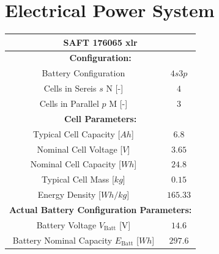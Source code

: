 \section{Electrical Power System} \label{sec:AppendixEPS}
\begin{table}[htb]
\centering
\begin{tabular}{|c|c|}
\hline
\multicolumn{2}{|c|}{\textbf{SAFT 176065 xlr} \cite{SAFTBatteries.2018}}                                                                \\ \hline
\multicolumn{2}{|c|}{\textbf{Configuration:}}                                                                 \\ \hline
Battery Configuration                                                           & $4s3p$                        \\ \hline
Cells in Sereis $s$ N [-]                                                       & $4$                           \\ \hline
Cells in Parallel $p$ M [-]                                                     & $3$                           \\ \hline
\multicolumn{2}{|c|}{\textbf{Cell Parameters:}}                                                               \\ \hline
Typical Cell Capacity   [$Ah$]                                                    & $6.8$                         \\ \hline
Nominal Cell Voltage [$V$]                                                        & $3.65$                        \\ \hline
Nominal Cell Capacity [$Wh$]                                                      & $24.8$                        \\ \hline
Typical Cell Mass [$kg$]                                                          & $0.15$                        \\ \hline
Energy Density [$Wh/kg$]                                                     & $165.33$                      \\ \hline
\multicolumn{2}{|c|}{\textbf{Actual Battery Configuration Parameters:}}                                       \\ \hline
Battery Voltage $V_\text{Batt}$ [V]                                             & $14.6$                        \\ \hline
Battery Nominal Capacity $E_\text{Batt}$ [$Wh$]                                   & $297.6$                       \\ \hline

\end{tabular}
\end{table}
